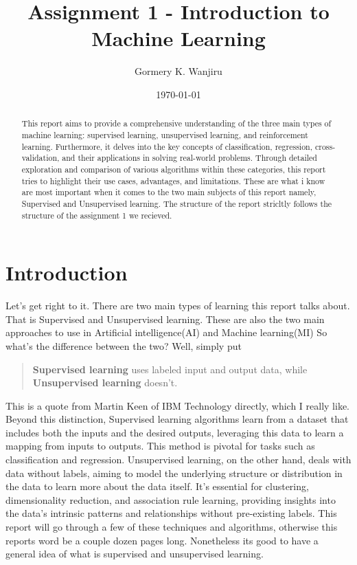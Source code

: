 \documentclass[11pt]{article}
\title{Assignment 1 - Introduction to Machine Learning}
\author{Gormery K. Wanjiru}
\date{\today}
\begin{document}
\maketitle
\begin{abstract}
  This report aims to provide a comprehensive understanding of the three main types of machine learning: supervised learning, unsupervised learning, and reinforcement learning. Furthermore, it delves into the key concepts of classification, regression, cross-validation, and their applications in solving real-world problems. Through detailed exploration and comparison of various algorithms within these categories, this report tries to highlight their use cases, advantages, and limitations. These are what i know are most important when it comes to the two main subjects of this report namely, Supervised and Unsupervised learning.
  The structure of the report stricltly follows the structure of the assignment 1 we recieved.
\end{abstract}
  

\newpage
\tableofcontents
\newpage

\section{Introduction}
Let's get right to it. There are two main types of learning this report talks about. That is Supervised and Unsupervised learning. These are also the two main approaches to use in Artificial intelligence(AI) and Machine learning(MI) So what's the difference between the two? Well, simply put
\begin{quote}
\textbf{Supervised learning} uses labeled input and output data, while \textbf{Unsupervised learning} doesn't.
\end{quote}

This is a quote from Martin Keen of IBM Technology directly, which I really like. Beyond this distinction, Supervised learning algorithms learn from a dataset that includes both the inputs and the desired outputs, leveraging this data to learn a mapping from inputs to outputs. This method is pivotal for tasks such as classification and regression. Unsupervised learning, on the other hand, deals with data without labels, aiming to model the underlying structure or distribution in the data to learn more about the data itself. It's essential for clustering, dimensionality reduction, and association rule learning, providing insights into the data's intrinsic patterns and relationships without pre-existing labels.
This report will go through a few of these techniques and algorithms, otherwise  this reports word be a couple dozen pages long. Nonetheless its good to have a general idea of what is supervised and unsupervised learning.
\end{document}
